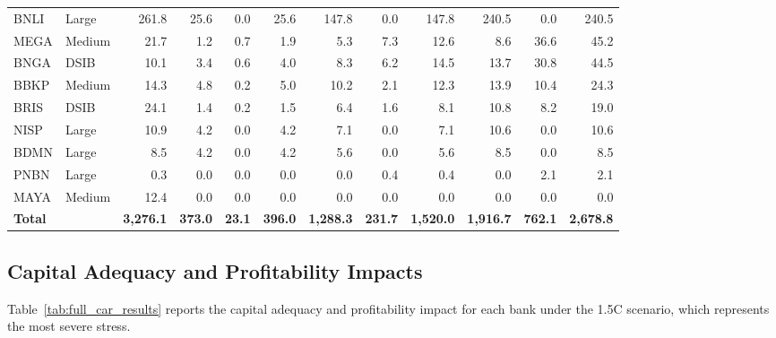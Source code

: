 \begin{landscape}
\begin{longtable}{llrrrrrrrrrr}
BNLI & Large & 261.8 & 25.6 & 0.0 & 25.6 & 147.8 & 0.0 & 147.8 & 240.5 & 0.0 & 240.5 \\
MEGA & Medium & 21.7 & 1.2 & 0.7 & 1.9 & 5.3 & 7.3 & 12.6 & 8.6 & 36.6 & 45.2 \\
BNGA & DSIB & 10.1 & 3.4 & 0.6 & 4.0 & 8.3 & 6.2 & 14.5 & 13.7 & 30.8 & 44.5 \\
BBKP & Medium & 14.3 & 4.8 & 0.2 & 5.0 & 10.2 & 2.1 & 12.3 & 13.9 & 10.4 & 24.3 \\
BRIS & DSIB & 24.1 & 1.4 & 0.2 & 1.5 & 6.4 & 1.6 & 8.1 & 10.8 & 8.2 & 19.0 \\
NISP & Large & 10.9 & 4.2 & 0.0 & 4.2 & 7.1 & 0.0 & 7.1 & 10.6 & 0.0 & 10.6 \\
BDMN & Large & 8.5 & 4.2 & 0.0 & 4.2 & 5.6 & 0.0 & 5.6 & 8.5 & 0.0 & 8.5 \\
PNBN & Large & 0.3 & 0.0 & 0.0 & 0.0 & 0.0 & 0.4 & 0.4 & 0.0 & 2.1 & 2.1 \\
MAYA & Medium & 12.4 & 0.0 & 0.0 & 0.0 & 0.0 & 0.0 & 0.0 & 0.0 & 0.0 & 0.0 \\
\midrule
\textbf{Total} & & \textbf{3,276.1} & \textbf{373.0} & \textbf{23.1} & \textbf{396.0} & \textbf{1,288.3} & \textbf{231.7} & \textbf{1,520.0} & \textbf{1,916.7} & \textbf{762.1} & \textbf{2,678.8} \\
\end{longtable}
\end{landscape}


\subsection{Capital Adequacy and Profitability Impacts}
\label{subsec:full_car}

Table~\ref{tab:full_car_results} reports the capital adequacy and profitability impact for each bank under the 1.5\textdegree C scenario, which represents the most severe stress.


